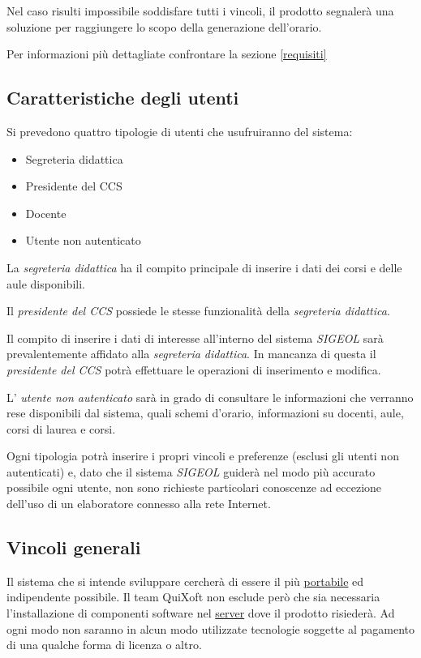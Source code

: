 \documentclass[11pt,a4paper]{article}
\begin{document}
Nel caso risulti impossibile soddisfare tutti i vincoli, il prodotto segnalerà una soluzione per raggiungere lo scopo della generazione dell'orario.

Per informazioni più dettagliate confrontare la sezione \ref{requisiti}
\subsection{Caratteristiche degli utenti} \label{utenti}
Si prevedono quattro tipologie di utenti che usufruiranno del sistema:
\begin{itemize}
 \item Segreteria didattica
 \item Presidente del CCS
 \item Docente
 \item Utente non autenticato
\end{itemize}

La \textit{segreteria didattica} ha il compito principale di inserire i dati dei corsi e delle aule disponibili.


Il \textit{presidente del CCS} possiede le stesse funzionalità della \textit{segreteria didattica}. 


Il compito di inserire i dati di interesse all'interno del sistema \textit{SIGEOL} sarà prevalentemente affidato alla \textit{segreteria didattica}. In mancanza di questa il \textit{presidente del CCS} potrà effettuare le operazioni di inserimento e modifica.

L' \textit{utente non autenticato} sarà in grado di consultare le informazioni che verranno rese disponibili dal sistema, quali schemi d'orario, informazioni su docenti, aule, corsi di laurea e corsi.

Ogni tipologia potrà inserire i propri vincoli e preferenze (esclusi gli utenti non autenticati) e, dato che il sistema \textit{SIGEOL} guiderà nel modo più accurato possibile ogni utente, non sono richieste particolari conoscenze ad eccezione dell'uso di un elaboratore connesso alla rete Internet.
\subsection{Vincoli generali}
Il sistema che si intende sviluppare cercherà di essere il più \underline{portabile} ed indipendente possibile. Il team QuiXoft non esclude però che sia necessaria l'installazione di componenti software nel \underline{server} dove il prodotto risiederà. Ad ogni modo non saranno in alcun modo utilizzate tecnologie soggette al pagamento di una qualche forma di licenza o altro.
\end{document}
